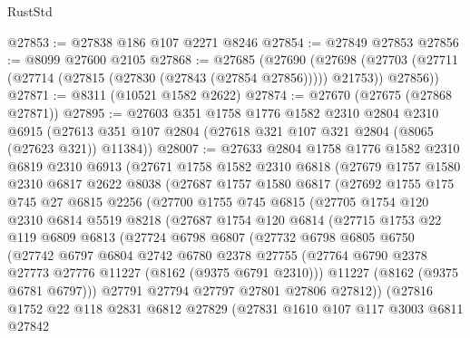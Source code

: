 \begin{lexlean}{RustStd}
\begin{coremodule}
@27853 := @27838 @186 @107 @2271 @8246
@27854 := @27849 @27853
@27856 := @8099 @27600 @2105
@27868 := @27685
    (@27690
      (@27698 (@27703 (@27711 (@27714 (@27815 (@27830 (@27843 (@27854 @27856))))) @21753)) @27856))
@27871 := @8311 (@10521 @1582 @2622)
@27874 := @27670 (@27675 (@27868 @27871))
@27895 := @27603
    @351
    @1758
    @1776
    @1582
    @2310
    @2804
    @2310
    @6915
    (@27613 @351 @107 @2804 (@27618 @321 @107 @321 @2804 (@8065 (@27623 @321)) @11384))
@28007 := @27633
    @2804
    @1758
    @1776
    @1582
    @2310
    @6819
    @2310
    @6913
    (@27671
      @1758
      @1582
      @2310
      @6818
      (@27679
        @1757
        @1580
        @2310
        @6817
        @2622
        @8038
        (@27687
          @1757
          @1580
          @6817
          (@27692
            @1755
            @175
            @745
            @27
            @6815
            @2256
            (@27700
              @1755
              @745
              @6815
              (@27705
                @1754
                @120
                @2310
                @6814
                @5519
                @8218
                (@27687
                  @1754
                  @120
                  @6814
                  (@27715
                    @1753
                    @22
                    @119
                    @6809
                    @6813
                    (@27724
                      @6798
                      @6807
                      (@27732
                        @6798
                        @6805
                        @6750
                        (@27742
                          @6797
                          @6804
                          @2742
                          @6780
                          @2378
                          @27755
                          (@27764 @6790 @2378 @27773 @27776 @11227 (@8162 (@9375 @6791 @2310)))
                          @11227
                          (@8162 (@9375 @6781 @6797)))
                        @27791
                        @27794
                        @27797
                        @27801
                        @27806
                        @27812))
                    (@27816
                      @1752
                      @22
                      @118
                      @2831
                      @6812
                      @27829
                      (@27831
                        @1610
                        @107
                        @117
                        @3003
                        @6811
                        @27842

\end{coremodule}
\end{lexlean}
